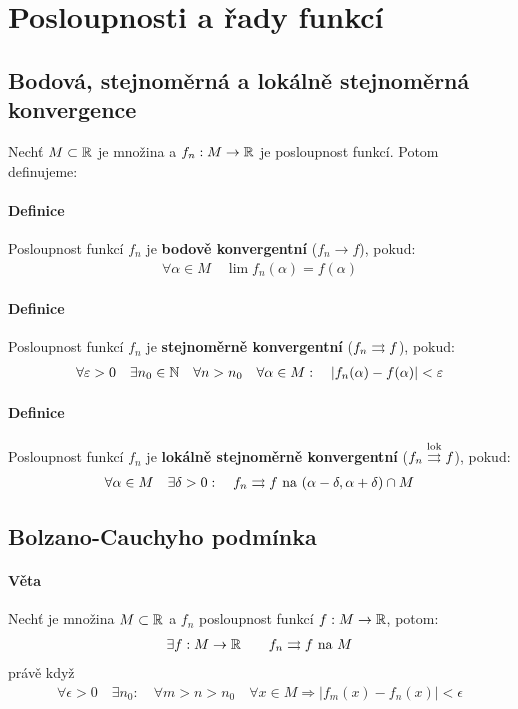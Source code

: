 \documentclass[a4paper,10pt]{article}
\begin{document}
\section{Posloupnosti a řady funkcí}
\setcounter{equation}{0}
\subsection{Bodová, stejnoměrná a lokálně stejnoměrná konvergence}
\setcounter{equation}{0}
Nechť $M \subset \mathbb{R}$ je množina a $f_n: M \to \mathbb{R}$ je posloupnost funkcí. Potom
definujeme:
\paragraph{Definice}
Posloupnost funkcí $f_n$ je \textbf{bodově konvergentní} ($f_n
\to f$), pokud:
\begin{align*}
	\forall \alpha \in M \quad \lim f_n(\alpha) = f(\alpha)
\end{align*}
\paragraph{Definice}
Posloupnost funkcí $f_n$ je \textbf{stejnoměrně konvergentní} ($f_n \rightrightarrows f$), pokud:
\begin{align*}
	\forall \varepsilon > 0 \quad \exists n_0 \in \mathbb{N} \quad \forall n > n_0 \quad \forall
	\alpha \in M: \quad |f_n(\alpha) - f(\alpha)| < \varepsilon
\end{align*}
\paragraph{Definice}
Posloupnost funkcí $f_n$ je \textbf{lokálně stejnoměrně konvergentní} ($f_n
\overset{\text{lok}}{\rightrightarrows} f$), pokud:
\begin{align*}
	\forall \alpha \in M \quad \exists \delta > 0: \quad f_n \rightrightarrows f \text{ na }
	(\alpha-\delta, \alpha+\delta) \cap M
\end{align*}



\subsection{Bolzano-Cauchyho podmínka}
\label{bc-podminka}
\setcounter{equation}{0}
\paragraph{Věta}
Nechť je množina $M \subset \mathbb{R}$ a $f_n$ posloupnost funkcí $f: M \to \mathbb{R}$, potom:
\begin{align*}
	\exists f: M \to \mathbb{R} \qquad f_n \rightrightarrows f \text{ na } M
\end{align*}
právě když
\begin{align*}
	\forall \epsilon > 0 \quad \exists n_0: \quad \forall m > n > n_0 \quad
	\forall x \in M \Rightarrow |f_m(x) - f_n(x)| < \epsilon
\end{align*}
\end{document}

